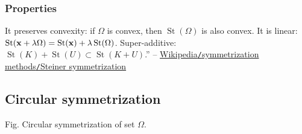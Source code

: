 \documentclass[oneside]{book}
\numberwithin{equation}{section}
\begin{document}
\subsubsection{Properties}
It preserves convexity: if $\Omega$ is convex, then $\operatorname{St}(\Omega)$ is also convex. It is linear: $\operatorname{St}({\bf x} + \lambda\Omega) = \operatorname{St}({\bf x}) + \lambda\operatorname{St}(\Omega)$. Super-additive: $\operatorname{St}(K) + \operatorname{St}(U)\subset\operatorname{St}(K + U)$.'' -- \href{https://en.wikipedia.org/wiki/Symmetrization_methods#Steiner_symmetrization}{Wikipedia\texttt{/}symmetrization methods\texttt{/}Steiner symmetrization}

\subsection{Circular symmetrization}
\textsf{Fig. Circular symmetrization of set $\Omega$.}
\end{document}
